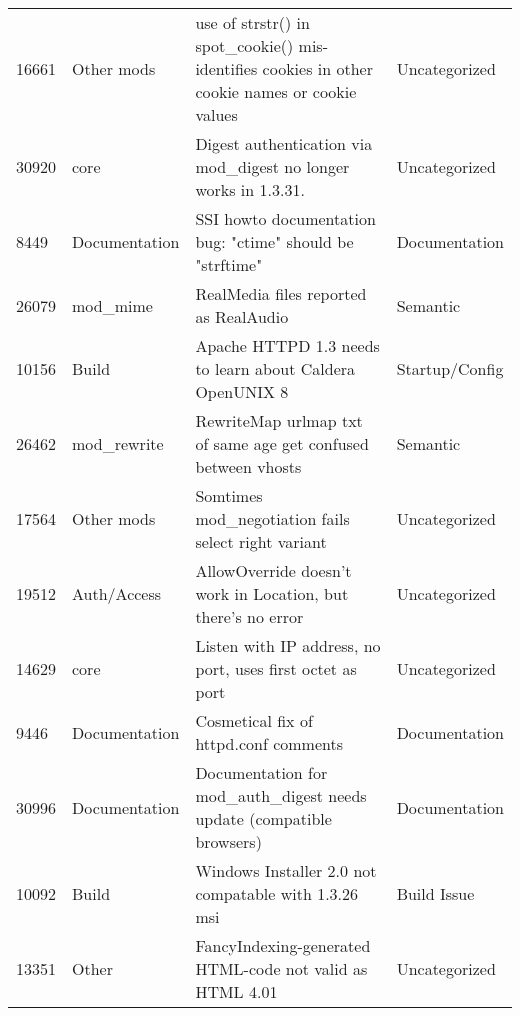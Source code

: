 \begin{longtable}[c]{llll}
16661  & Other mods         & use of strstr() in spot\_cookie() mis-identifies cookies in other cookie names or cookie values                & Uncategorized     \\
30920  & core               & Digest authentication via mod\_digest no longer works in 1.3.31.                                               & Uncategorized     \\
8449   & Documentation      & SSI howto documentation bug: "ctime" should be "strftime"                                                      & Documentation     \\
26079  & mod\_mime          & RealMedia files reported as RealAudio                                                                          & Semantic          \\
10156  & Build              & Apache HTTPD 1.3 needs to learn about Caldera OpenUNIX 8                                                       & Startup/Config    \\
26462  & mod\_rewrite       & RewriteMap urlmap txt of same age get confused between vhosts                                                  & Semantic          \\
17564  & Other mods         & Somtimes mod\_negotiation fails  select right variant                                                          & Uncategorized     \\
19512  & Auth/Access        & AllowOverride doesn't work in Location, but there's no error                              & Uncategorized     \\
14629  & core               & Listen with IP address, no port, uses first octet as port                                                      & Uncategorized     \\
9446   & Documentation      & Cosmetical fix of httpd.conf comments                                                                          & Documentation     \\
30996  & Documentation      & Documentation for mod\_auth\_digest needs update (compatible browsers)                                         & Documentation     \\
10092  & Build              & Windows Installer 2.0 not compatable with 1.3.26 msi                                                           & Build Issue       \\
13351  & Other              & FancyIndexing-generated HTML-code not valid as HTML 4.01                                                       & Uncategorized     \\

\end{longtable}
